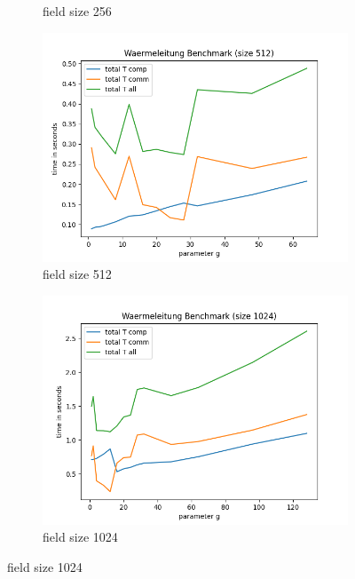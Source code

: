 \documentclass[12pt]{article}
\begin{document}
\begin{figure}[!htb]
\begin{subfigure}{0.5\textwidth}
        \caption{field size 256}\label{fig:plot_256_tot}
    \end{subfigure}
    \newline
    \begin{subfigure}{0.5\textwidth}
        \centering
        \includegraphics[scale=0.5]{../benchmark/plots/plot_total_512.png}
        \caption{field size 512}\label{fig:plot_512_tot}
    \end{subfigure}
	\begin{subfigure}{0.5\textwidth}
        \centering
        \includegraphics[scale=0.5]{../benchmark/plots/plot_total_1024.png}
        \caption{field size 1024}\label{fig:plot_1024_tot}
    \end{subfigure}

\end{figure}
\end{document}
